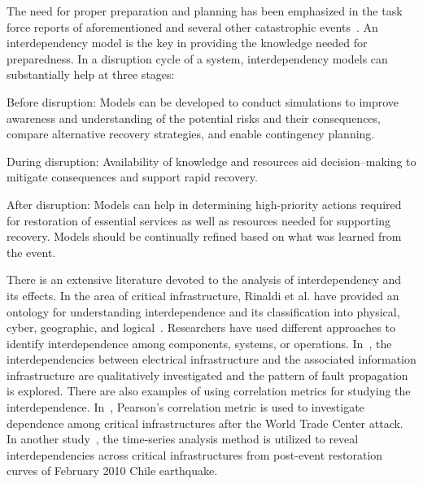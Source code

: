 \documentclass[12pt]{elsarticle}
\begin{document}
The need for proper preparation and planning has been emphasized in the task force reports of aforementioned and several other catastrophic events~\cite{FERC12,BeA04,A14Rp}. An interdependency model is the key in providing the knowledge needed for preparedness. In a disruption cycle of a system, interdependency models can substantially help at three stages:
\begin{basedescript}{\desclabelstyle{\pushlabel}}
  \item[Before disruption:] Models can be developed to conduct simulations to improve awareness and understanding of the potential risks and their consequences, compare alternative recovery strategies, and enable contingency planning.
  \item[During disruption:] Availability of knowledge and resources aid decision--making to mitigate consequences and support rapid recovery.
  \item[After disruption:] Models can help in determining high-priority actions required for restoration of essential services as well as resources needed for supporting recovery. Models should be continually refined based on what was learned from the event.
\end{basedescript}

There is an extensive literature devoted to the analysis of interdependency and its effects. In the area of critical infrastructure, Rinaldi et al. have provided an ontology for understanding interdependence and its classification into physical, cyber, geographic, and logical~\cite{RiP01}.
Researchers have used different approaches to identify interdependence among components, systems, or operations. In~\cite{LaK07}, the interdependencies between electrical infrastructure and the associated information infrastructure are qualitatively investigated and the pattern of fault propagation is explored. There are also examples of using correlation metrics for studying the interdependence. In~\cite{MeW06}, Pearson's correlation metric is used to investigate dependence among critical infrastructures after the World Trade Center attack. In another study~\cite{DuK12}, the time-series analysis method is utilized to reveal interdependencies across critical infrastructures from post-event restoration curves of February 2010 Chile earthquake. %
\end{document}
